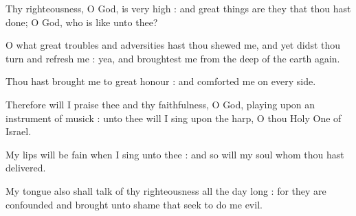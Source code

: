 Thy righteousness, O God, is very high : and great things are they that thou hast done; O God, who is like unto thee?\par
{}O what great troubles and adversities hast thou shewed me, and yet didst thou turn and refresh me : yea, and broughtest me from the deep of the earth again.\par
{}Thou hast brought me to great honour : and comforted me on every side.\par
{}Therefore will I praise thee and thy faithfulness, O God, playing upon an instrument of musick : unto thee will I sing upon the harp, O thou Holy One of Israel.\par
{}My lips will be fain when I sing unto thee : and so will my soul whom thou hast delivered.\par
{}My tongue also shall talk of thy righteousness all the day long : for they are confounded and brought unto shame that seek to do me evil.\par



